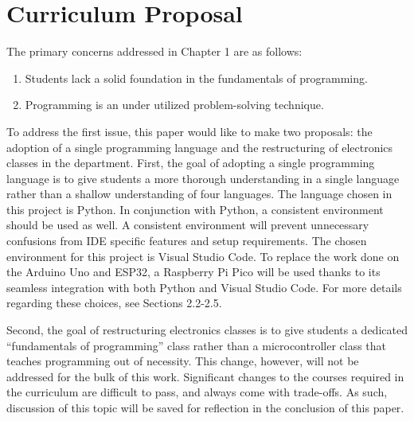 \section{Curriculum Proposal}

The primary concerns addressed in Chapter 1 are as follows:

\begin{enumerate}
    \item Students lack a solid foundation in the fundamentals of programming.
    \item Programming is an under utilized problem-solving technique.
\end{enumerate}
To address the first issue, this paper would like to make two proposals: the adoption of a single programming 
language and the restructuring of electronics classes in the department. First, the goal of adopting a single 
programming language is to give students a more thorough understanding in a single language rather than 
a shallow understanding of four languages. The language chosen in this project is Python. In conjunction with 
Python, a consistent environment should be used as well. A consistent environment will prevent unnecessary 
confusions from IDE specific features and setup requirements. The chosen environment for this project is 
Visual Studio Code. To replace the work done on the Arduino Uno and ESP32, a Raspberry Pi Pico will be used 
thanks to its seamless integration with both Python and Visual Studio Code. For more details regarding these 
choices, see Sections 2.2-2.5.

Second, the goal of restructuring electronics classes is to give students a dedicated ``fundamentals of 
programming'' class rather than a microcontroller class that teaches programming out of necessity. This
change, however, will not be addressed for the bulk of this work. Significant changes to the courses
required in the curriculum are difficult to pass, and always come with trade-offs. As such, discussion of 
this topic will be saved for reflection in the conclusion of this paper.


